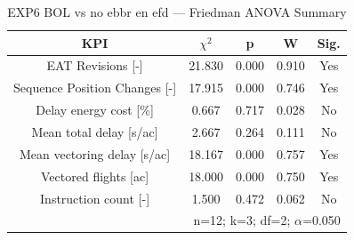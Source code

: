 \begin{table}[!t]
\caption{EXP6 BOL vs no ebbr en efd — Friedman ANOVA Summary}
\begin{center}
\footnotesize
\setlength{\tabcolsep}{3pt}
\renewcommand{\arraystretch}{1.000}
\begin{tabular}{|c|c|c|c|c|}
\hline
\textbf{KPI} & \textbf{$\chi^2$} & \textbf{p} & \textbf{W} & \textbf{Sig.} \\
\hline
EAT Revisions [-] & 21.830 & 0.000 & 0.910 & Yes \\
\hline
Sequence Position Changes [-] & 17.915 & 0.000 & 0.746 & Yes \\
\hline
Delay energy cost [\%] & 0.667 & 0.717 & 0.028 & No \\
\hline
Mean total delay [s/ac] & 2.667 & 0.264 & 0.111 & No \\
\hline
Mean vectoring delay [s/ac] & 18.167 & 0.000 & 0.757 & Yes \\
\hline
Vectored flights [ac] & 18.000 & 0.000 & 0.750 & Yes \\
\hline
Instruction count [-] & 1.500 & 0.472 & 0.062 & No \\
\hline
\multicolumn{5}{r}{n=12; k=3; df=2; $\alpha$=0.050}\\
\end{tabular}
\label{tab:exp6\_bol\_vs\_no\_ebbr\_en\_efd\_friedman}
\end{center}
\end{table}